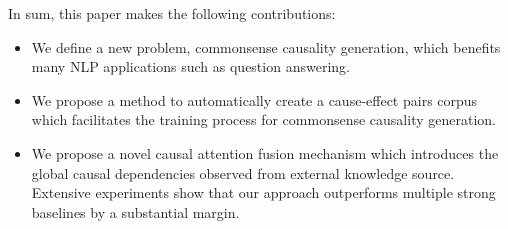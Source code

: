 In sum, this paper makes the following contributions:
\begin{itemize}
	\item We define a new problem, commonsense causality generation, which benefits many NLP applications such as question answering.
	\item We propose a method to automatically create a cause-effect pairs corpus which facilitates the training process for commonsense causality generation.
	\item We propose a novel causal attention fusion mechanism which introduces the global causal dependencies observed from external knowledge source. Extensive experiments show that our approach outperforms multiple strong baselines by a substantial margin.
\end{itemize}



